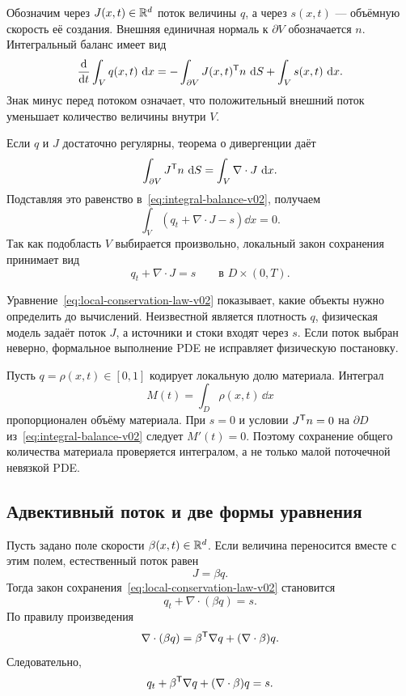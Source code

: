 Обозначим через $J(x,t)\in\mathbb{R}^d$ поток величины $q$, а через $s(x,t)$ --- объёмную скорость её создания. Внешняя единичная нормаль к $\partial V$ обозначается $n$. Интегральный баланс имеет вид
\begin{equation}
\label{eq:integral-balance-v02}
\frac{\mathop{}\!\mathrm{d}}{\mathop{}\!\mathrm{d} t}
\int_V q(x,t)\,\mathop{}\!\mathrm{d} x
=
-\int_{\partial V}J(x,t)^{\mathsf{T}}n\,\mathop{}\!\mathrm{d} S
+
\int_V s(x,t)\,\mathop{}\!\mathrm{d} x.
\end{equation}
Знак минус перед потоком означает, что положительный внешний поток уменьшает количество величины внутри $V$.

Если $q$ и $J$ достаточно регулярны, теорема о дивергенции даёт
\[
\int_{\partial V}J^{\mathsf{T}}n\,\mathop{}\!\mathrm{d} S
=
\int_V\nabla\cdot J\,\mathop{}\!\mathrm{d} x.
\]
Подставляя это равенство в~\eqref{eq:integral-balance-v02}, получаем
\[
\int_V
\left(
q_t+\nabla\cdot J-s
\right)\dd x
=0.
\]
Так как подобласть $V$ выбирается произвольно, локальный закон сохранения принимает вид
\begin{equation}
\label{eq:local-conservation-law-v02}
q_t+\nabla\cdot J=s
\qquad
\text{в }D\times(0,T).
\end{equation}

Уравнение~\eqref{eq:local-conservation-law-v02} показывает, какие объекты нужно определить до вычислений. Неизвестной является плотность $q$, физическая модель задаёт поток $J$, а источники и стоки входят через $s$. Если поток выбран неверно, формальное выполнение PDE не исправляет физическую постановку.

\begin{application}
Пусть $q=\rho(x,t)\in[0,1]$ кодирует локальную долю материала. Интеграл
\[
M(t)=\int_D\rho(x,t)\,\dd x
\]
пропорционален объёму материала. При $s=0$ и условии $J^{\mathsf{T}}n=0$ на $\partial D$ из~\eqref{eq:integral-balance-v02} следует $M'(t)=0$. Поэтому сохранение общего количества материала проверяется интегралом, а не только малой поточечной невязкой PDE.
\end{application}

\subsection{Адвективный поток и две формы уравнения}

Пусть задано поле скорости $\beta(x,t)\in\mathbb{R}^d$. Если величина переносится вместе с этим полем, естественный поток равен
\begin{equation}
\label{eq:advective-flux-v02}
J=\beta q.
\end{equation}
Тогда закон сохранения~\eqref{eq:local-conservation-law-v02} становится
\begin{equation}
\label{eq:conservative-transport-v02}
q_t+\nabla\cdot(\beta q)=s.
\end{equation}
По правилу произведения
\begin{equation}
\label{eq:divergence-product-v02}
\nabla\cdot(\beta q)
=
\beta^{\mathsf{T}}\nabla q
+
(\nabla\cdot\beta)q.
\end{equation}
Следовательно,
\begin{equation}
\label{eq:expanded-conservative-transport-v02}
q_t
+
\beta^{\mathsf{T}}\nabla q
+
(\nabla\cdot\beta)q
=s.
\end{equation}

